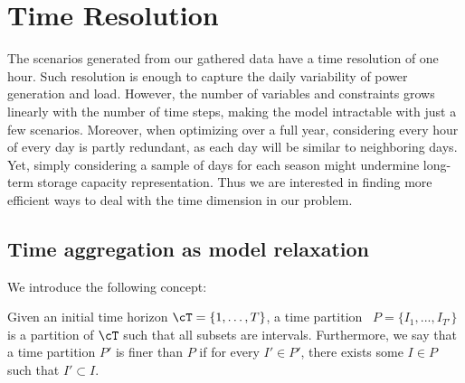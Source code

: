 


















\section{Time Resolution}\label{section:time-resolution}


The scenarios generated from our gathered data have a time resolution of one hour. 
Such resolution is enough to capture the daily variability of power generation and load. 
However, the number of variables and constraints grows linearly with the number of time steps, making the model intractable with just a few scenarios.
Moreover, when optimizing over a full year, considering every hour of every day is partly redundant, as each day will be similar to neighboring days. 
Yet, simply considering a sample of days for each season might undermine long-term storage capacity representation. 
Thus we are interested in finding more efficient ways to deal with the time dimension in our problem.

\subsection{Time aggregation as model relaxation}\label{subsection: relax}

We introduce the following concept:
\begin{definition}
Given an initial time horizon \(\cT = \{1, \ldots, T\}\), a time partition  \(P=\{I_1,...,I_{T'}\}\) is a partition of \(\cT\) such that all subsets are intervals. 
Furthermore, we say that a time partition \(P'\) is finer than \(P\) if for every \(I' \in P'\), there exists some \(I \in P\) such that \(I' \subset I\).
\end{definition}

